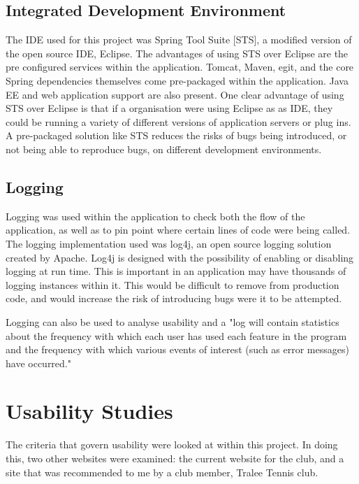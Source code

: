 \subsection{Integrated Development Environment}

The IDE used for this project was Spring Tool Suite [STS], a modified version of the open source IDE, Eclipse. The advantages of using STS over Eclipse are the pre configured services within the application. Tomcat, Maven, egit, and the core Spring dependencies themselves come pre-packaged within the application. Java EE and web application support are also present. One clear advantage of using STS over Eclipse is that if a organisation were using Eclipse as as IDE, they could be running a variety of different versions of application servers or plug ins. A pre-packaged solution like STS reduces the risks of bugs being introduced, or not being able to reproduce bugs, on different development environments.

\subsection{Logging}

Logging was used within the application to check both the flow of the application, as well as to pin point where certain lines of code were being called. The logging implementation used was log4j, an open source logging solution created by Apache. Log4j is designed with the possibility of enabling or disabling logging at run time. This is important in an application may have thousands of logging instances within it. This would be difficult to remove from production code, and would increase the risk of introducing bugs were it to be attempted. 

Logging can also be used to analyse usability and a "log will contain statistics about the frequency with which each user has used each feature in the program and the frequency with which various events of interest (such as error messages) have occurred." \parencite{holzinger2005usability}

\section{Usability Studies}

The criteria that govern usability were looked at within this project. In doing this, two other websites were examined: the current website for the club, and a site that was recommended to me by a club member, Tralee Tennis club. 


